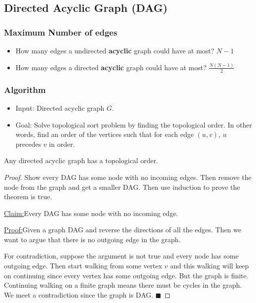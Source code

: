 \documentclass[en,hazy,blue,normal,12pt]{elegantnote}
\newenvironment{claim}[1]{\par\noindent\underline{Claim:}\space#1}{}
\newenvironment{claimproof}[1]{\par\noindent\underline{Proof:}\space#1}{\hfill $\blacksquare$}
\begin{document}
\subsection{Directed Acyclic Graph (DAG)}
\subsubsection{Maximum Number of edges}
\begin{itemize}
\item How many edges a undirected \textbf{acyclic} graph could have at most? 
$N-1$
\item How many edges a directed \textbf{acyclic} graph could have at most? 
$\frac{N(N-1)}{2}$
\end{itemize}
\subsubsection{Algorithm}
\begin{itemize}
 \item Input: Directed acyclic graph $G$.
 \item Goal: Solve topological sort problem by finding the topological order. 
In other words, find an order of the vertices such that for each edge $(u, v)$, 
$u$ precedes $v$ in order.
\end{itemize}
\begin{theorem}
 Any directed acyclic graph has a topological order.
\end{theorem}

\begin{proof}
Show every DAG has some node with no incoming edges. Then remove the node from 
the graph and get a smaller DAG. Then use induction to prove the theorem is 
true.

\begin{claim}
Every DAG has some node with no incoming edge.
\end{claim}
\begin{claimproof}
Given a graph DAG and reverse the directions of all the edges. Then we want to 
argue that there is no outgoing edge in the graph.

For contradiction, suppose the argument is not true and every node has some 
outgoing edge. Then start walking from some vertex $v$ and this walking will 
keep on continuing since every vertex has some outgoing edge. But the graph is 
finite. Continuing walking on a finite graph means there must be cycles in the 
graph. We meet a contradiction since the graph is DAG.
\end{claimproof}
\end{proof}
\end{document}
